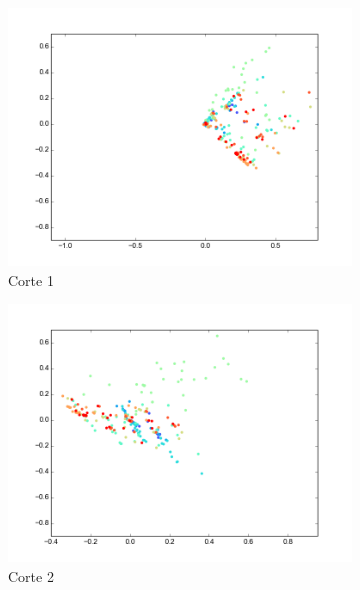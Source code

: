 \begin{figure}[H]
        \begin{subfigure}[b]{0.33\textwidth}
                \includegraphics[width=\linewidth]{secciones/graficos/oja/eje1_valid.png}
                \caption{Corte 1}
                \label{fig: ej1_oja_eje_1_valid}
        \end{subfigure}
        \begin{subfigure}[b]{0.33\textwidth}
                \includegraphics[width=\linewidth]{secciones/graficos/oja/eje2_valid.png}
                \caption{Corte 2}
                \label{fig: ej1_oja_eje_2_valid}
        \end{subfigure}
        \begin{subfigure}[b]{0.33\textwidth}

\end{subfigure}
\end{figure}
